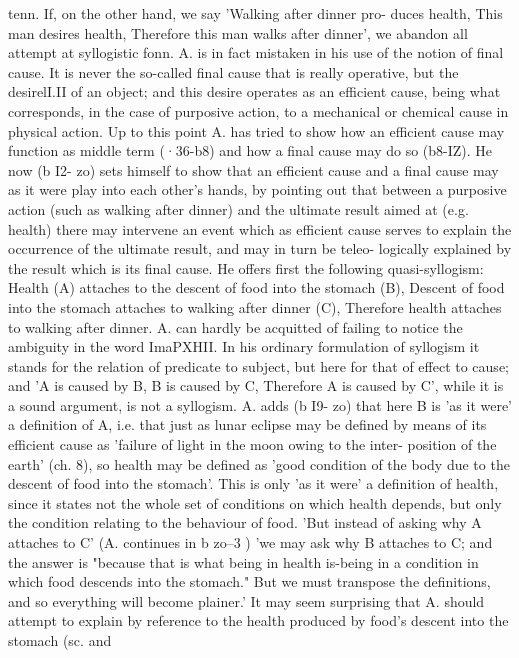 {{{{{{{{{{{{{{{{{{{{{{{{{{{{{{{{{{{{{{{{{{{{{{{{{{{{{{{tenn. If, on the other hand, we say 'Walking after dinner pro-
duces health, This man desires health, Therefore this man walks
after dinner', we abandon all attempt at syllogistic fonn. A. is
in fact mistaken in his use of the notion of final cause. It is never
the so-called final cause that is really operative, but the desirelI.II
of an object; and this desire operates as an efficient cause, being
what corresponds, in the case of purposive action, to a mechanical
or chemical cause in physical action.
Up to this point A. has tried to show how an efficient cause may
function as middle term (·36-b8) and how a final cause may do so
(b8-IZ). He now (b I2- zo) sets himself to show that an efficient
cause and a final cause may as it were play into each other's hands,
by pointing out that between a purposive action (such as walking
after dinner) and the ultimate result aimed at (e.g. health) there
may intervene an event which as efficient cause serves to explain
the occurrence of the ultimate result, and may in turn be teleo-
logically explained by the result which is its final cause. He offers
first the following quasi-syllogism: Health (A) attaches to the
descent of food into the stomach (B), Descent of food into the
stomach attaches to walking after dinner (C), Therefore health
attaches to walking after dinner. A. can hardly be acquitted of
failing to notice the ambiguity in the word ImaPXHII. In his
ordinary formulation of syllogism it stands for the relation of
predicate to subject, but here for that of effect to cause; and
'A is caused by B, B is caused by C, Therefore A is caused by C',
while it is a sound argument, is not a syllogism.
A. adds (b I9- zo) that here B is 'as it were' a definition of A,
i.e. that just as lunar eclipse may be defined by means of its
efficient cause as 'failure of light in the moon owing to the inter-
position of the earth' (ch. 8), so health may be defined as 'good
condition of the body due to the descent of food into the stomach'.
This is only 'as it were' a definition of health, since it states not
the whole set of conditions on which health depends, but only
the condition relating to the behaviour of food.
'But instead of asking why A attaches to C' (A. continues in
b zo--3 ) 'we may ask why B attaches to C; and the answer is
"because that is what being in health is-being in a condition
in which food descends into the stomach." But we must transpose
the definitions, and so everything will become plainer.' It may
seem surprising that A. should attempt to explain by reference to
the health produced by food's descent into the stomach (sc. and
}}}}}}}}}}}}}}}}}}}}}}}}}}}}}}}}}}}}}}}}}}}}}}}}}}}}}}}
